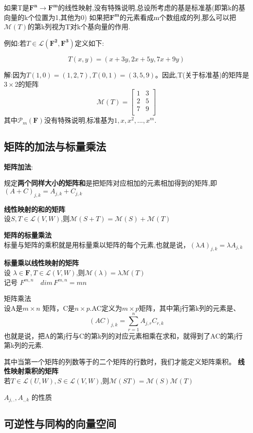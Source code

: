 \par 如果T是$\mathbf{F^n} \to \mathbf{F^m}$的线性映射,没有特殊说明,总设所考虑的基是标准基(即第k的基向量的k个位置为1,其他为0)
如果把$\mathbf{F^m}$的元素看成m个数组成的列,那么可以把$\mathcal{M}(T)$的第k列视为T对k个基向量的作用.
\par 例如:若$T\in \mathcal{L}(\mathbf{F^2},\mathbf{F^3})$定义如下:

        $$
        T(x,y)=(x+3y,2x+5y,7x+9y)
        $$

\par 解:因为$T(1,0)=(1,2,7),T(0,1)=(3,5,9)$。因此,T(关于标准基)的矩阵是$3\times 2$的矩阵
$$
\mathcal{M}(T)=
\begin{bmatrix}
        1&3  \\
        2&5  \\
        7&9  \\
       \end{bmatrix}      
$$
其中$\mathcal{P}_m(\mathbf{F})$没有特殊说明,标准基为$1,x,x^2,...,x^m$. 
\subsection{矩阵的加法与标量乘法}

\textbf{矩阵加法}:
\begin{definition}
        规定\textbf{两个同样大小的矩阵和}是把矩阵对应相加的元素相加得到的矩阵,即
        $(A+C)_{j,k}=A_{j,k}+C_{j,k}$
\end{definition}
\textbf{线性映射的和的矩阵}\\
设$S,T\in \mathcal{L}(V,W)$,则$\mathcal{M}(S+T)=\mathcal{M}(S)+\mathcal{M}(T)$\\
\par \textbf{矩阵的标量乘法}\\
标量与矩阵的乘积就是用标量乘以矩阵的每个元素,也就是说，$(\lambda A)_{j,k}=\lambda A_{j,k} $
\par  \textbf{标量乘以线性映射的矩阵}\\
设 $\lambda\in \mathbf{F},T\in \mathcal{L}(V,W)$,则$\mathcal{M}(\lambda)=\lambda\mathcal{M}(T)$\\


记号 $F^{m,n}\quad dim\,F^{m,n}=mn$\\

\begin{definition}
        矩阵乘法\\
        设A是$m\times n$ 矩阵，C是$n\times p$.AC定义为$m\times p$矩阵，其中第j行第k列的元素是、
        $$
        (AC)_{j,k}=\sum_{r=1}^{n}A_{j,r}C_{r,k}
        $$
       也就是说，把A的第j行与C的第k列的对应元素相乘在求和，就得到了AC的第j行第k列的元素. 
\end{definition}
其中当第一个矩阵的列数等于的二个矩阵的行数时，我们才能定义矩阵乘积。
\textbf{线性映射乘积的矩阵}\\
若$T\in \mathcal{L}(U,W),S\in \mathcal{L}(V,W)$,则$\mathcal{M}(ST)=\mathcal{M}(S)\mathcal{M}(T)$
\par $A_{j,.},A_{.,k}$ 的性质
\newpage
\subsection{可逆性与同构的向量空间}
